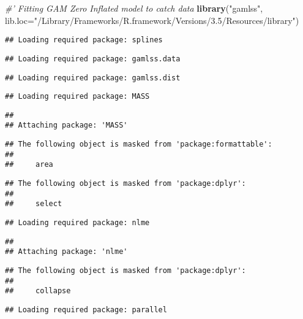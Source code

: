 \documentclass[]{article}
\newenvironment{Shaded}{\begin{snugshade}}{\end{snugshade}}
\newcommand{\KeywordTok}[1]{\textcolor[rgb]{0.13,0.29,0.53}{\textbf{#1}}}
\newcommand{\DataTypeTok}[1]{\textcolor[rgb]{0.13,0.29,0.53}{#1}}
\newcommand{\StringTok}[1]{\textcolor[rgb]{0.31,0.60,0.02}{#1}}
\newcommand{\CommentTok}[1]{\textcolor[rgb]{0.56,0.35,0.01}{\textit{#1}}}
\newcommand{\NormalTok}[1]{#1}
\begin{document}
\begin{Shaded}
\begin{Highlighting}[]
\CommentTok{#' Fitting GAM Zero Inflated model to catch data}
\KeywordTok{library}\NormalTok{(}\StringTok{"gamlss"}\NormalTok{, }\DataTypeTok{lib.loc=}\StringTok{"/Library/Frameworks/R.framework/Versions/3.5/Resources/library"}\NormalTok{)}
\end{Highlighting}
\end{Shaded}

\begin{verbatim}
## Loading required package: splines
\end{verbatim}

\begin{verbatim}
## Loading required package: gamlss.data
\end{verbatim}

\begin{verbatim}
## Loading required package: gamlss.dist
\end{verbatim}

\begin{verbatim}
## Loading required package: MASS
\end{verbatim}

\begin{verbatim}
## 
## Attaching package: 'MASS'
\end{verbatim}

\begin{verbatim}
## The following object is masked from 'package:formattable':
## 
##     area
\end{verbatim}

\begin{verbatim}
## The following object is masked from 'package:dplyr':
## 
##     select
\end{verbatim}

\begin{verbatim}
## Loading required package: nlme
\end{verbatim}

\begin{verbatim}
## 
## Attaching package: 'nlme'
\end{verbatim}

\begin{verbatim}
## The following object is masked from 'package:dplyr':
## 
##     collapse
\end{verbatim}

\begin{verbatim}
## Loading required package: parallel
\end{verbatim}
\end{document}
